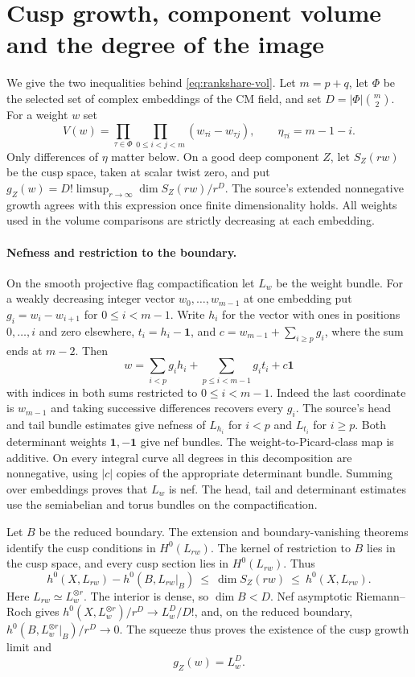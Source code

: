 \section{Cusp growth, component volume and the degree of the image}
\label{sec:component-volume}
We give the two inequalities behind \eqref{eq:rankshare-vol}. Let
\(m=p+q\), let \(\Phi\) be the selected set of complex embeddings of the
CM field, and set \(D=|\Phi|\binom m2\). For a weight \(w\) set
\[
 V(w)=\prod_{\tau\in\Phi}\prod_{0\le i< j<m}(w_{\tau i}-w_{\tau j}),
 \qquad \eta_{\tau i}=m-1-i .
\]
Only differences of \(\eta\) matter below. On a good deep component \(Z\),
let \(S_Z(rw)\) be the cusp space, taken at scalar twist zero, and put
\(g_Z(w)=D!\limsup_{r\to\infty}\dim S_Z(rw)/r^D\). The source's
extended nonnegative growth agrees with this expression once finite
dimensionality holds. All weights used in the volume comparisons are
strictly decreasing at each embedding.

\paragraph{Nefness and restriction to the boundary.}
On the smooth projective flag compactification let \(L_w\) be the weight
bundle. For a weakly decreasing integer vector \(w_0,\ldots,w_{m-1}\)
at one embedding put \(g_i=w_i-w_{i+1}\) for \(0\le i<m-1\).
Write \(h_i\) for the vector with ones in positions \(0,\ldots,i\) and
zero elsewhere, \(t_i=h_i-\mathbf 1\), and
\(c=w_{m-1}+\sum_{i\ge p}g_i\), where the sum ends at \(m-2\). Then
\[
 w=\sum_{i<p}g_i h_i+\sum_{p\le i<m-1}g_i t_i+c\mathbf 1
\]
with indices in both sums restricted to \(0\le i<m-1\).
Indeed the last coordinate is \(w_{m-1}\) and taking successive differences
recovers every \(g_i\). The source's head and tail bundle estimates give
nefness of \(L_{h_i}\) for \(i<p\) and \(L_{t_i}\) for \(i\ge p\).
Both determinant weights \(\mathbf 1,-\mathbf 1\) give nef bundles.
The weight-to-Picard-class map is additive. On every integral curve all
degrees in this decomposition are nonnegative, using \(|c|\) copies
of the appropriate determinant bundle. Summing over embeddings proves
that \(L_w\) is nef. The head, tail and determinant estimates use the
semiabelian and torus bundles on the compactification.

Let \(B\) be the reduced boundary. The extension and boundary-vanishing
theorems identify the cusp conditions in \(H^0(L_{rw})\). The kernel of
restriction to \(B\) lies in the cusp space, and every cusp section lies
in \(H^0(L_{rw})\). Thus
\[
 h^0(X,L_{rw})-h^0(B,L_{rw}|_B)
 \ \le\ \dim S_Z(rw)\ \le\ h^0(X,L_{rw}) .
\]
Here \(L_{rw}\simeq L_w^{\otimes r}\). The interior is dense, so
\(\dim B<D\). Nef asymptotic Riemann--Roch gives
\(h^0(X,L_w^{\otimes r})/r^D\to L_w^D/D!\), and, on the reduced
boundary, \(h^0(B,L_w^{\otimes r}|_B)/r^D\to0\).
The squeeze thus proves the existence of the cusp growth limit and
\begin{equation}\label{eq:volume-nef-growth}g_Z(w)=L_w^D.\end{equation}

